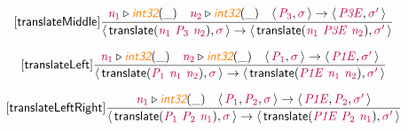 \documentclass[10pt,leqno,fleqn]{article}
\newcommand{\artVariable}[1]{\mbox{\color{purple}\em #1\/}}
\newcommand{\artConstructor}[1]{\mbox{\sf #1}}
\newcommand{\artSpecial}[1]{\mbox{\color{orange}\sf\em #1}}
\begin{document}
\begin{equation}
\tag*{[\artConstructor{\sf translateMiddle}]}
\begin{split}\frac{ \artVariable{n$_{1}$}\triangleright \artSpecial{int32}(\_) \quad  \artVariable{n$_{2}$}\triangleright \artSpecial{int32}(\_) \quad \langle\, \artVariable{P$_{3}$}, \artVariable{$\sigma$}\,\rangle \rightarrow \langle\, \artVariable{P3E}, \artVariable{$\sigma$\/$^\prime$}\,\rangle }{\langle\, \artConstructor{\sf translate}(\artVariable{n$_{1}$}\ \artVariable{P$_{3}$}\ \artVariable{n$_{2}$}), \artVariable{$\sigma$}\,\rangle \rightarrow \langle\, \artConstructor{\sf translate}(\artVariable{n$_{1}$}\ \artVariable{P3E}\ \artVariable{n$_{2}$}), \artVariable{$\sigma$\/$^\prime$}\,\rangle }
\end{split}
\end{equation}

\begin{equation}
\tag*{[\artConstructor{\sf translateLeft}]}
\begin{split}\frac{ \artVariable{n$_{1}$}\triangleright \artSpecial{int32}(\_) \quad  \artVariable{n$_{2}$}\triangleright \artSpecial{int32}(\_) \quad \langle\, \artVariable{P$_{1}$}, \artVariable{$\sigma$}\,\rangle \rightarrow \langle\, \artVariable{P1E}, \artVariable{$\sigma$\/$^\prime$}\,\rangle }{\langle\, \artConstructor{\sf translate}(\artVariable{P$_{1}$}\ \artVariable{n$_{1}$}\ \artVariable{n$_{2}$}), \artVariable{$\sigma$}\,\rangle \rightarrow \langle\, \artConstructor{\sf translate}(\artVariable{P1E}\ \artVariable{n$_{1}$}\ \artVariable{n$_{2}$}), \artVariable{$\sigma$\/$^\prime$}\,\rangle }
\end{split}
\end{equation}

\begin{equation}
\tag*{[\artConstructor{\sf translateLeftRight}]}
\begin{split}\frac{ \artVariable{n$_{1}$}\triangleright \artSpecial{int32}(\_) \quad \langle\, \artVariable{P$_{1}$}, \artVariable{P$_{2}$}, \artVariable{$\sigma$}\,\rangle \rightarrow \langle\, \artVariable{P1E}, \artVariable{P$_{2}$}, \artVariable{$\sigma$\/$^\prime$}\,\rangle }{\langle\, \artConstructor{\sf translate}(\artVariable{P$_{1}$}\ \artVariable{P$_{2}$}\ \artVariable{n$_{1}$}), \artVariable{$\sigma$}\,\rangle \rightarrow \langle\, \artConstructor{\sf translate}(\artVariable{P1E}\ \artVariable{P$_{2}$}\ \artVariable{n$_{1}$}), \artVariable{$\sigma$\/$^\prime$}\,\rangle }
\end{split}
\end{equation}
\end{document}
